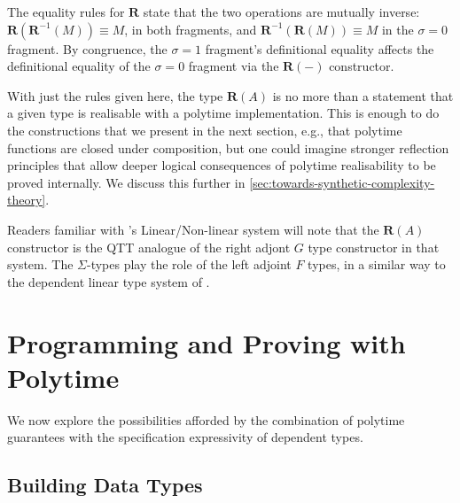 \documentclass[acmsmall,screen]{acmart}
\newcommand{\Rtype}{\mathbf{R}}
\newcommand{\rIntro}{\mathbf{R}}
\newcommand{\rElim}{\mathbf{R}^{-1}}
\begin{document}
The equality rules for $\Rtype$ state that the two operations are
mutually inverse: $\rIntro(\rElim(M)) \equiv M$, in both fragments,
and $\rElim(\rIntro(M)) \equiv M$ in the $\sigma = 0$ fragment. By
congruence, the $\sigma = 1$ fragment's definitional equality affects
the definitional equality of the $\sigma = 0$ fragment via the
$\rIntro(-)$ constructor.

With just the rules given here, the type $\Rtype(A)$ is no more than a
statement that a given type is realisable with a polytime
implementation. This is enough to do the constructions that we present
in the next section, e.g., that polytime functions are closed under
composition, but one could imagine stronger reflection principles that
allow deeper logical consequences of polytime realisability to be
proved internally. We discuss this further in
\autoref{sec:towards-synthetic-complexity-theory}.

Readers familiar with \citet{Benton94}'s Linear/Non-linear system will
note that the $\Rtype(A)$ constructor is the QTT analogue of the right
adjont $G$ type constructor in that system. The $\Sigma$-types play
the role of the left adjoint $F$ types, in a similar way to the
dependent linear type system of \citet{KrishnaswamiPB15}.

\section{Programming and Proving with Polytime}
\label{sec:programming-polytime}

We now explore the possibilities afforded by the combination of
polytime guarantees with the specification expressivity of dependent
types.

\subsection{Building Data Types}
\label{sec:prog-datatypes}
\end{document}

